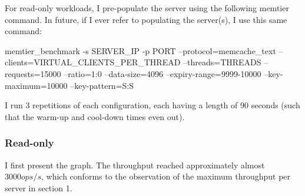 \documentclass[11pt,a4paper]{article}
\begin{document}
For read-only workloads, I pre-populate the server using the following memtier command. 
In future, if I ever refer to populating the server(s), I use this same command:
\begin{spverbatim}
      memtier_benchmark -s {SERVER_IP} -p {PORT}
      --protocol=memcache_text --clients={VIRTUAL_CLIENTS_PER_THREAD} --threads={THREADS}
      --requests=15000 --ratio=1:0 --data-size=4096
     --expiry-range=9999-10000 --key-maximum=10000 --key-pattern=S:S
\end{spverbatim}

I run 3 repetitions of each configuration, each having a length of 90 seconds (such that the warm-up and cool-down times even out).

\subsubsection{Read-only}

I first present the graph. 
The throughput reached approximately almost $3000ops/s$, which conforms to the observation of the maximum throughput per server in section 1. 
\end{document}
